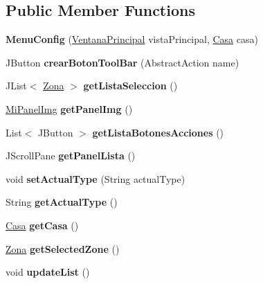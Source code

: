 \subsection*{Public Member Functions}
\begin{DoxyCompactItemize}
\item 
\mbox{\label{classvista_1_1_menu_config_a8816357996dfe08ce3e7e2f1a140676f}} 
{\bfseries Menu\+Config} (\mbox{\hyperlink{classvista_1_1_ventana_principal}{Ventana\+Principal}} vista\+Principal, \mbox{\hyperlink{classmodelo_1_1_casa}{Casa}} casa)
\item 
\mbox{\label{classvista_1_1_menu_config_a67a67d59622932be75d810d984872be0}} 
J\+Button {\bfseries crear\+Boton\+Tool\+Bar} (Abstract\+Action name)
\item 
\mbox{\label{classvista_1_1_menu_config_aa025274f7663f42bae01619ad9cb2608}} 
J\+List$<$ \mbox{\hyperlink{classmodelo_1_1_zona}{Zona}} $>$ {\bfseries get\+Lista\+Seleccion} ()
\item 
\mbox{\label{classvista_1_1_menu_config_a750880517f79d71e51129f20b78f149d}} 
\mbox{\hyperlink{classvista_1_1_mi_panel_img}{Mi\+Panel\+Img}} {\bfseries get\+Panel\+Img} ()
\item 
\mbox{\label{classvista_1_1_menu_config_afe98141e06e8626e4ade8b9d5f04155f}} 
List$<$ J\+Button $>$ {\bfseries get\+Lista\+Botones\+Acciones} ()
\item 
\mbox{\label{classvista_1_1_menu_config_a4c3eef77fde182cbf4af1b9d3025424c}} 
J\+Scroll\+Pane {\bfseries get\+Panel\+Lista} ()
\item 
\mbox{\label{classvista_1_1_menu_config_a0ebbf9d5ec630071ee53b2b0cdbc52ef}} 
void {\bfseries set\+Actual\+Type} (String actual\+Type)
\item 
\mbox{\label{classvista_1_1_menu_config_a88aae2ab7436ffc6a08a5d62c4b8cec3}} 
String {\bfseries get\+Actual\+Type} ()
\item 
\mbox{\label{classvista_1_1_menu_config_acebc3b3ad4cbccf1adf2be86993e7be6}} 
\mbox{\hyperlink{classmodelo_1_1_casa}{Casa}} {\bfseries get\+Casa} ()
\item 
\mbox{\label{classvista_1_1_menu_config_ac8e0381bd5316a1bca4eeae90a1570a9}} 
\mbox{\hyperlink{classmodelo_1_1_zona}{Zona}} {\bfseries get\+Selected\+Zone} ()
\item 
\mbox{\label{classvista_1_1_menu_config_af350e1398cbcb22c4c621cc7216bc37e}} 
void {\bfseries update\+List} ()
\end{DoxyCompactItemize}



